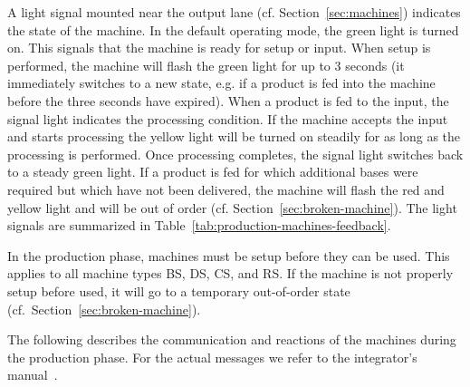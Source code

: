 \documentclass[12pt,twoside]{article}
\newcommand{\refsec}[1]{Section~\ref{#1}}
\newcommand{\reftab}[1]{Table~\ref{#1}}
\begin{document}
A light signal mounted near the output lane
(cf. \refsec{sec:machines}) indicates the state of the machine. In the
default operating mode, the green light is turned on. This signals
that the machine is ready for setup or input. When setup is performed,
the machine will flash the green light for up to 3 seconds (it
immediately switches to a new state, e.g. if a product is fed into the
machine before the three seconds have expired). When a product is fed
to the input, the signal light indicates the processing condition. If
the machine accepts the input and starts processing the yellow light
will be turned on steadily for as long as the processing is
performed. Once processing completes, the signal light switches back to a
steady green light. If a product is fed for which additional bases
were required but which have not been delivered, the machine will
flash the red and yellow light and will be out of order
(cf. \refsec{sec:broken-machine}). The light signals are summarized in
\reftab{tab:production-machines-feedback}.

In the production phase, machines must be setup before they can be
used. This applies to all machine types BS, DS, CS, and RS. If the
machine is not properly setup before used, it will go to a temporary
out-of-order state (cf.~\refsec{sec:broken-machine}).

The following describes the communication and reactions of the
machines during the production phase. For the actual messages we refer
to the integrator's manual~\cite{RefBoxIntManual}.
\end{document}
